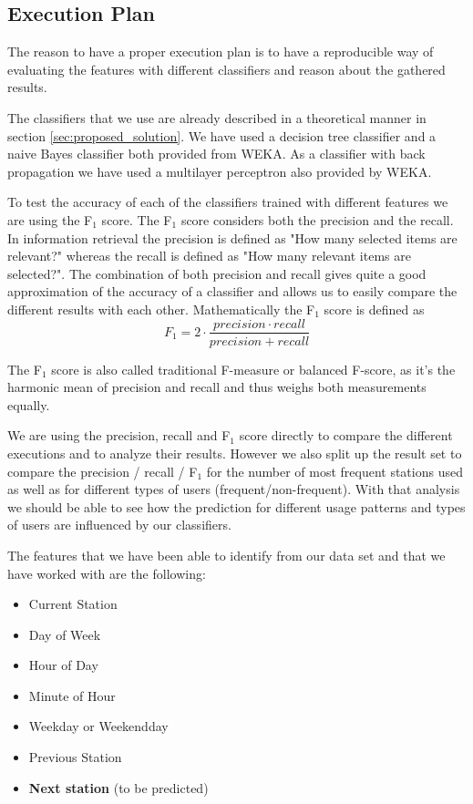 \subsection{Execution Plan}
The reason to have a proper execution plan is to have a reproducible way of evaluating the features with different classifiers and reason about the gathered results. 

The classifiers that we use are already described in a theoretical manner in section \ref{sec:proposed_solution}. We have used a decision tree classifier and a naive Bayes classifier both provided from WEKA. As a classifier with back propagation we have used a multilayer perceptron also provided by WEKA.

To test the accuracy of each of the classifiers trained with different features we are using the F$_{1}$ score. The F$_{1}$ score considers both the precision and the recall. In information retrieval the precision is defined as "How many selected items are relevant?" whereas the recall is defined as "How many relevant items are selected?". The combination of both precision and recall gives quite a good approximation of the accuracy of a classifier and allows us to easily compare the different results with each other. Mathematically the F$_{1}$ score is defined as 
\begin{equation}\label{equation:F1Score}
F_{1} = 2 \cdot \frac{precision \cdot recall}{precision + recall}
\end{equation}

The F$_{1}$ score is also called traditional F-measure or balanced F-score, as it's the harmonic mean of precision and recall and thus weighs both measurements equally.

We are using the precision, recall and F$_{1}$ score directly to compare the different executions and to analyze their results. However we also split up the result set to compare the precision / recall / F$_{1}$ for the number of most frequent stations used as well as for different types of users (frequent/non-frequent). With that analysis we should be able to see how the prediction for different usage patterns and types of users are influenced by our classifiers.

The features that we have been able to identify from our data set and that we have worked with are the following:
\begin{itemize}
	\item Current Station
	\item Day of Week
	\item Hour of Day
	\item Minute of Hour
	\item Weekday or Weekendday
	\item Previous Station
	\item \textbf{Next station} (to be predicted)
\end{itemize}


